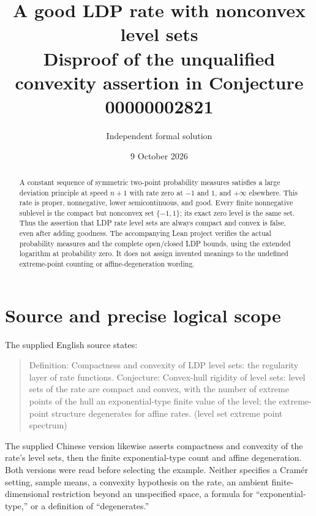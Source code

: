 \documentclass[11pt]{article}
\title{A good LDP rate with nonconvex level sets\\
\large Disproof of the unqualified convexity assertion in Conjecture 00000002821}
\author{Independent formal solution}
\date{9 October 2026}
\begin{document}
\maketitle

\begin{abstract}
A constant sequence of symmetric two-point probability measures satisfies a
large deviation principle at speed $n+1$ with rate zero at $-1$ and $1$, and
$+\infty$ elsewhere. This rate is proper, nonnegative, lower semicontinuous,
and good. Every finite nonnegative sublevel is the compact but nonconvex set
$\{-1,1\}$; its exact zero level is the same set. Thus the assertion that LDP
rate level sets are always compact and convex is false, even after adding
goodness. The accompanying Lean project verifies the actual probability
measures and the complete open/closed LDP bounds, using the extended logarithm
at probability zero. It does not assign invented meanings to the undefined
extreme-point counting or affine-degeneration wording.
\end{abstract}

\section{Source and precise logical scope}

The supplied English source states:
\begin{quote}
Definition: Compactness and convexity of LDP level sets: the regularity layer
of rate functions. Conjecture: Convex-hull rigidity of level sets: level sets
of the rate are compact and convex, with the number of extreme points of the
hull an exponential-type finite value of the level; the extreme-point
structure degenerates for affine rates. (level set extreme point spectrum)
\end{quote}
The supplied Chinese version likewise asserts compactness and convexity of
the rate's level sets, then the finite exponential-type count and affine
degeneration. Both versions were read before selecting the example. Neither
specifies a Cram\'er setting, sample means, a convexity hypothesis on the rate,
an ambient finite-dimensional restriction beyond an unspecified space, a
formula for ``exponential-type,'' or a definition of ``degenerates.''
\end{document}
